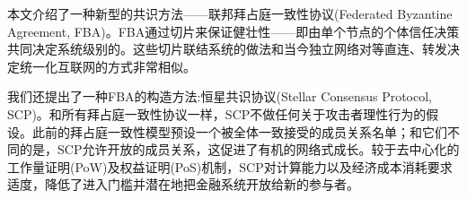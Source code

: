 \abstract{}
本文介绍了一种新型的共识方法——联邦拜占庭一致性协议(Federated Byzantine Agreement, FBA)。FBA通过{\quorum}切片来保证健壮性——即由单个节点的个体信任决策共同决定系统级别的{\quorum}。这些切片联结系统的做法和当今独立网络对等直连、转发决定统一化互联网的方式非常相似。

我们还提出了一种FBA的构造方法:恒星共识协议(Stellar Consensus Protocol, SCP)。和所有拜占庭一致性协议一样，SCP不做任何关于攻击者理性行为的假设。此前的拜占庭一致性模型预设一个被全体一致接受的成员关系名单；和它们不同的是，SCP允许开放的成员关系，这促进了有机的网络式成长。较于去中心化的工作量证明(PoW)及权益证明(PoS)机制，SCP对计算能力以及经济成本消耗要求适度，降低了进入门槛并潜在地把金融系统开放给新的参与者。